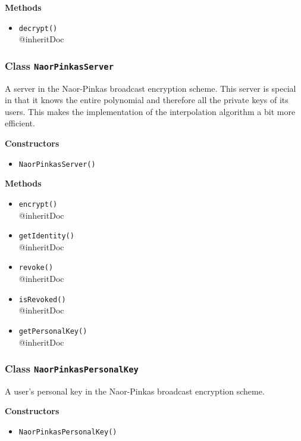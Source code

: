 \textbf{Methods}
\begin{itemize}
\item \lstinline|decrypt()| \\
{@inheritDoc}

\end{itemize}

\subsubsection{Class \lstinline|NaorPinkasServer|}
A server in the Naor-Pinkas broadcast encryption scheme. This server is special in that it knows
 the entire polynomial and therefore all the private keys of its users. This makes the implementation
 of the interpolation algorithm a bit more efficient.

\textbf{Constructors}
\begin{itemize}
\item \lstinline|NaorPinkasServer()| \\


\end{itemize}

\textbf{Methods}
\begin{itemize}
\item \lstinline|encrypt()| \\
{@inheritDoc}

\item \lstinline|getIdentity()| \\
{@inheritDoc}

\item \lstinline|revoke()| \\
{@inheritDoc}

\item \lstinline|isRevoked()| \\
{@inheritDoc}

\item \lstinline|getPersonalKey()| \\
{@inheritDoc}

\end{itemize}

\subsubsection{Class \lstinline|NaorPinkasPersonalKey|}
A user's personal key in the Naor-Pinkas broadcast encryption scheme.

\textbf{Constructors}
\begin{itemize}
\item \lstinline|NaorPinkasPersonalKey()| \\


\end{itemize}

